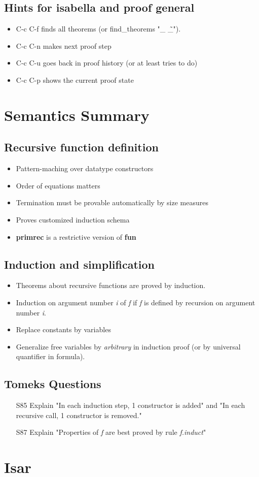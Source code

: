 \documentclass{article}
\begin{document}
\subsection {Hints for isabella and proof general}
\begin{itemize}
	\item C-c C-f finds all theorems (or find\_theorems "\_ \~ \_").
        \item C-c C-n makes next proof step
        \item C-c C-u goes back in proof history (or at least tries to do)
        \item C-c C-p shows the current proof state
\end{itemize}


\section{Semantics Summary}
\subsection{Recursive function definition}
\begin{itemize}
	\item Pattern-maching over datatype constructors
	\item Order of equations matters
	\item Termination must be provable automatically by size measures
	\item Proves customized induction schema
	\item \textbf{primrec} is a restrictive version of \textbf{fun}
\end{itemize}
\subsection{Induction and simplification}
\begin{itemize}
	\item Theorems about recursive functions are proved by induction.
	\item Induction on argument number \textit{i} of \textit{f} if \textit{f} is defined by recursion on argument number \textit{i}.
	\item Replace constants by variables
	\item Generalize free variables by \textit{arbitrary} in induction proof (or by universal quantifier in formula).
\end{itemize}

\subsection{Tomeks Questions}
\begin{itemize}
	\item [S85] Explain "In each induction step, 1 constructor is added" and "In each recursive call, 1 constructor is removed."
	\item [S87] Explain "Properties of \textit{f} are best proved by rule \textit{f.induct}"
\end{itemize}

\section {Isar}
\end{document}
